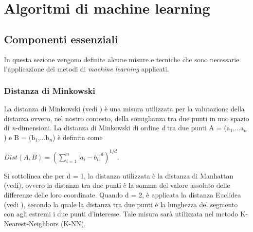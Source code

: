 
\chapter{Algoritmi di machine learning}
\label{cap:ML}
\section{Componenti essenziali}
In questa sezione vengono definite alcune misure e tecniche che sono necessarie l'applicazione dei metodi di \emph{machine learning} applicati.
\subsection{Distanza di Minkowski}
La distanza di Minkowski (vedi \textit{\cite{minkdist}}) è una misura utilizzata per la valutazione della distanza ovvero, nel nostro contesto, della somiglianza tra due punti in uno spazio di \textit{n}-dimensioni. La distanza di Minkowski di ordine \emph{d} tra due punti A = (a$_1$,...a$_n$) e B = (b$_1$,...b$_n$) è definita come
\begin{center}
	$Dist(A,B) =  \left(\sum_{i = 1}^{n}|a_i-b_i|^d\right)^{1/d} $.
\end{center}

Si sottolinea che per d = 1, la distanza utilizzata è la distanza di Manhattan (vedi\textit{\cite{manhattan}}), ovvero la distanza tra due punti è la somma del valore assoluto delle differenze delle loro coordinate. Quando d = 2, è applicata la distanza Euclidea (vedi \textit{\cite{euclidea}}), secondo la quale la distanza tra due punti è la lunghezza del segmento con agli estremi i due punti d'interesse.
Tale misura sarà utilizzata nel metodo K-Nearest-Neighbors (K-NN).
